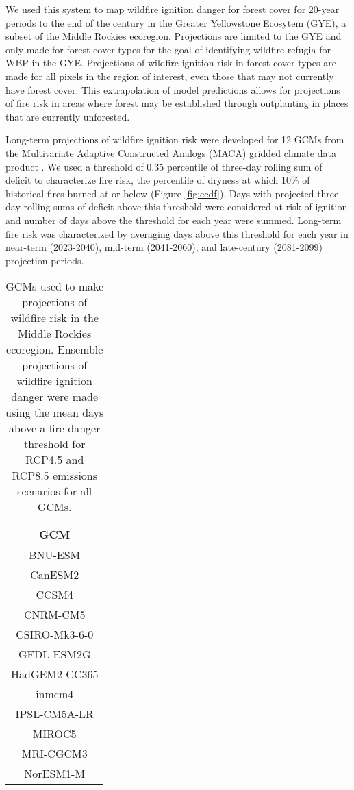 \documentclass[11p]{article}
\begin{document}
\begin{table}
{We used this system to map wildfire ignition danger for forest cover for 20-year periods to the end of the century in the Greater Yellowstone Ecosytem (GYE), a subset of the Middle Rockies ecoregion. Projections are limited to the GYE and only made for forest cover types for the goal of identifying wildfire refugia for WBP in the GYE. Projections of wildfire ignition risk in forest cover types are made for all pixels in the region of interest, even those that may not currently have forest cover. This extrapolation of model predictions allows for projections of fire risk in areas where forest may be established through outplanting in places that are currently unforested.

Long-term projections of wildfire ignition risk were developed for 12 GCMs from the Multivariate Adaptive Constructed Analogs (MACA) gridded climate data product \citep{abatzoglouComparisonStatisticalDownscaling2012}. We used a threshold of 0.35 percentile of three-day rolling sum of deficit to characterize fire risk, the percentile of dryness at which 10\% of historical fires burned at or below (Figure \ref{fig:ecdf}). Days with projected three-day rolling sums of deficit above this threshold were considered at risk of ignition and number of days above the threshold for each year were summed. Long-term fire risk was characterized by averaging days above this threshold for each year in near-term (2023-2040), mid-term (2041-2060), and late-century (2081-2099) projection periods. 

\begin{table}[htbp]
  \centering
  \begin{tabular}{ c }
    \hline
    GCM \\
    \hline
    BNU-ESM \\
    CanESM2 \\
    CCSM4 \\
    CNRM-CM5 \\
    CSIRO-Mk3-6-0 \\
    GFDL-ESM2G \\
    HadGEM2-CC365 \\
    inmcm4 \\
    IPSL-CM5A-LR \\
    MIROC5 \\
    MRI-CGCM3 \\
    NorESM1-M \\
    \hline
  \end{tabular}
  \caption{GCMs used to make projections of wildfire risk in the Middle Rockies ecoregion. Ensemble projections of wildfire ignition danger were made using the mean days above a fire danger threshold for RCP4.5 and RCP8.5 emissions scenarios for all GCMs.}
  \label{table:gcms}
\end{table}

}
\end{table}
\end{document}
